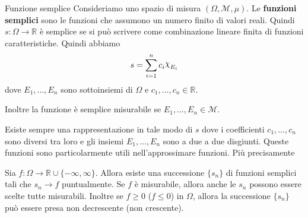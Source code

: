 \begin{definition}{Funzione semplice}
Consideriamo uno spazio di misura \((\Omega, \mathcal{M}, \mu)\). Le
\textbf{funzioni semplici}
sono le funzioni che assumono un numero finito di valori reali. Quindi
\(s : \Omega \to  \mathbb{R}\) è semplice se si può scrivere come combinazione
lineare finita di funzioni caratteristiche. Quindi abbiamo
\[
    s = \sum_{i=1}^{n} c_{i} \rchi_{E_{i}}
\]
dove \(E_{1}, \dots, E_{n}\) sono sottoinsiemi di \(\Omega\) e \(c_{1}, \dots,
c_{n} \in \mathbb{R}\).

Inoltre la funzione è semplice misurabile se \(E_{1}, \dots, E_{n} \in
\mathcal{M}\).
\end{definition}
Esiste sempre una rappresentazione in tale modo di \(s\) dove i coefficienti
\(c_{1}, \dots, c_{n}\) sono diversi tra loro e gli insiemi \(E_{1}, \dots,
E_{n}\) sono a due a due disgiunti. Queste funzioni sono particolarmente utili
nell'approssimare funzioni. Più precisamente
\begin{proposition}\label{prop:esistenza_semplici}
    Sia \(f : \Omega \to  \mathbb{R} \cup \{-\infty, \infty\} \). Allora esiste
    una successione \(\{s_{n}\} \) di funzioni semplici tali che \(s_{n} \to f\)
    puntualmente. Se \(f\) è misurabile, allora anche le \(s_{n}\) possono
    essere scelte tutte misurabili. Inoltre se \(f \ge 0\) (\(f \le 0\)) in \(\Omega\), allora
    la successione \(\{s_{n}\} \) può essere presa non decrescente (non
    crescente).
\end{proposition}
